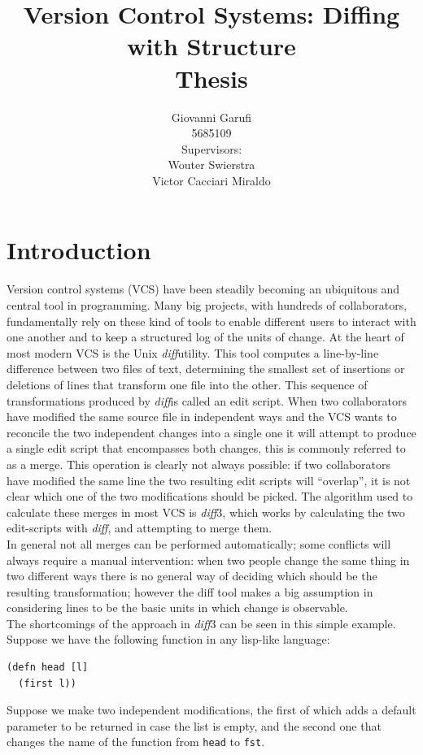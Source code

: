 \documentclass[11pt, titlepage]{article}
\title{Version Control Systems: Diffing with Structure
\\ Thesis}
\author{Giovanni Garufi\\5685109\\[1cm]{Supervisors: \\
    Wouter Swierstra \\
    Victor Cacciari Miraldo}}
\affil{Department of Computing Science\\University of Utrecht}
\newcommand{\toClojure}[1]{\texttt{#1}\xspace}
\newcommand{\diff}{\emph{diff}}
\begin{document}
  


\maketitle
\tableofcontents


\section{Introduction}
Version control systems (VCS) have been steadily becoming an ubiquitous and central 
tool in programming. Many big projects, with hundreds of collaborators, 
fundamentally rely on these kind of tools to enable different users to interact 
with one another and to keep a structured log of the units of change. 
At the heart of most modern VCS is the Unix \diff utility. This tool computes a 
line-by-line difference between two files of text, determining the smallest set 
of insertions or deletions of lines that transform one file into the other. This sequence of transformations produced by \diff is called an edit script. 
When two collaborators have modified the same source file in independent ways and the VCS wants to reconcile the two independent changes into a single one it will attempt to produce a single edit script that encompasses both changes, this is commonly referred to 
as a merge. This operation is clearly not always possible: if two collaborators have modified the same line the two resulting edit scripts will ``overlap'', it is not clear which one of the two modifications should be picked.  The algorithm used to calculate these merges in most VCS is \diff3, which works by calculating the two edit-scripts with \diff, and attempting to merge them.
\\
In general not all merges can be performed automatically; some conflicts will always require a manual intervention: when two 
people change the same thing in two different ways there is no general way of 
deciding which should be the resulting transformation; however the diff tool makes a big assumption in considering lines to be the basic units in which change is observable. 
\\
The shortcomings of the approach in \diff3 can be seen in this simple example.
Suppose we have the following function in any lisp-like language:

\begin{verbatim}
(defn head [l]
  (first l))
\end{verbatim}

Suppose we make two independent modifications, the first of which adds a default 
parameter to be returned in case the list is empty, and the second one that 
changes the name of the function from \toClojure{head} to \toClojure{fst}.
\end{document}
